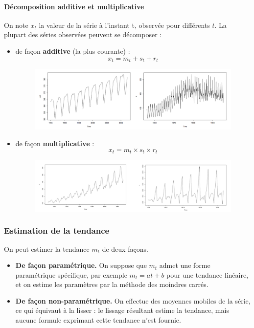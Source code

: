 \paragraph{Décomposition additive et multiplicative}
On note $x_{t}$ la valeur de la série à l'instant t, observée pour différents $t$.\newline
La plupart des séries observées peuvent se décomposer :
\begin{itemize}
\item de façon \textbf{additive} (la plus courante) : 
$$x_{t} = m_{t} + s_{t} + r_{t}$$
\begin{figure}[H]\begin{center}\includegraphics[scale=0.7]{ilu/ccm32.png}\end{center}\end{figure}
\item de façon \textbf{multiplicative} : 
$$x_{t} = m_{t} \times s_{t} \times r_{t}$$
\begin{figure}[H]\begin{center}\includegraphics[scale=0.7]{ilu/ccm33.png}\end{center}\end{figure}
\end{itemize}
\subsubsection{Estimation de la tendance}
On peut estimer la tendance $m_{t}$ de deux façons.
\begin{itemize}
\item \textbf{De façon paramétrique.}\newline
On suppose que $m_{t}$ admet une forme paramétrique spécifique, par exemple $m_{t} = at + b$ pour une tendance linéaire, et on estime les paramètres par la méthode des moindres carrés.
\item \textbf{De façon non-paramétrique.}\newline
On effectue des moyennes mobiles de la série, ce qui équivaut à la lisser : le lissage résultant estime la tendance, mais aucune formule exprimant cette tendance n'est fournie.
\end{itemize}
